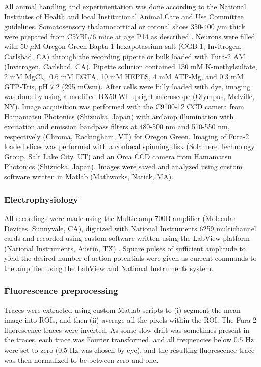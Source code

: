 All animal handling and experimentation was done according to the National Institutes of Health and local Institutional Animal Care and Use Committee guidelines. Somatosensory thalamocortical or coronal slices 350-400 $\mu$m thick were prepared from C57BL/6 mice at age P14 as described \cite{MacLeanYuste05}. Neurons were filled with 50 $\mu$M Oregon Green Bapta 1 hexapotassium salt (OGB-1; Invitrogen, Carlsbad, CA) through the recording pipette or bulk loaded with Fura-2 AM (Invitrogen, Carlsbad, CA). Pipette solution contained 130 mM K-methylsulfate, 2 mM MgCl$_2$, $0.6$ mM EGTA, 10 mM HEPES, 4 mM ATP-Mg, and $0.3$ mM GTP-Tris, pH 7.2 (295 mOsm).  After cells were fully loaded with dye, imaging was done by using a modified BX50-WI upright microscope (Olympus, Melville, NY).  Image acquisition was performed with the C9100-12 CCD camera from Hamamatsu Photonics (Shizuoka, Japan) with arclamp illumination with excitation and emission bandpass filters at 480-500 nm and 510-550 nm, respectively  (Chroma, Rockingham, VT) for Oregon Green. Imaging of Fura-2 loaded slices was performed with a confocal spinning disk (Solamere Technology Group, Salt Lake City, UT) and an Orca CCD camera from Hamamatsu Photonics (Shizuoka, Japan). Images were saved and analyzed using custom software written in Matlab (Mathworks, Natick, MA).

\subsubsection{Electrophysiology}

All recordings were made using the Multiclamp 700B amplifier (Molecular Devices, Sunnyvale, CA), digitized with National Instruments 6259 multichannel cards and recorded using custom software written using the LabView platform (National Instruments, Austin, TX) .  Square pulses of sufficient amplitude to yield the desired number of action potentials were given as current commands to the amplifier using the LabView and National Instruments system.

\subsubsection{Fluorescence preprocessing}

Traces were extracted using custom Matlab scripts to (i) segment the mean image into ROIs, and then (ii) average all the pixels within the ROI.  The Fura-2 fluorescence traces were inverted.  As some slow drift was sometimes present in the traces, each trace was Fourier transformed, and all frequencies below $0.5$ Hz were set to zero ($0.5$ Hz was chosen by eye), and the resulting fluorescence trace was then normalized to be between zero and one.  








